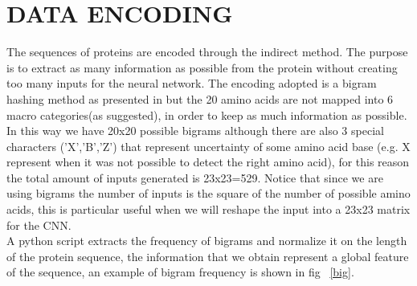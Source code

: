 \documentclass[a4paper, 10pt, conference]{ieeeconf}      %
\begin{document}
\section{DATA ENCODING}\label{sec:encoding}
	The sequences of proteins are encoded through the indirect method. The purpose is to extract as many information as possible from the protein without creating too many inputs for the neural network. The encoding adopted is a bigram hashing method as presented in \cite{bookWu} but the 20 amino acids are not mapped into 6 macro categories(as suggested), in order to keep as much information as possible. In this way we have 20x20 possible bigrams although there are also 3 special characters ('X','B','Z') that represent uncertainty of some amino acid base (e.g. X represent when it was not possible to detect the right amino acid), for this reason the total amount of inputs generated is 23x23=529. Notice that since we are using bigrams the number of inputs is the square of the number of possible amino acids, this is particular useful when we will reshape the input into a 23x23 matrix for the CNN.\\ A python script extracts the frequency of bigrams and normalize it on the length of the protein sequence, the information that we obtain represent a global feature of the sequence, an example of bigram frequency is shown in fig ~\ref{big}.
\end{document}
